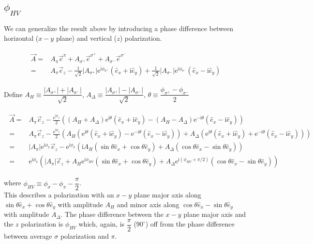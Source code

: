 \documentclass[10pt,fleqn]{article}
\newcommand{\ue}{\mathrm{e}}
\newcommand{\ui}{\mathrm{i}}
\newcommand{\eqar}[1]
{
  \begin{align}
    #1
  \end{align}
}
\newcommand{\paren}[1]{{\left({#1}\right)}}
\newcommand{\abs}[1]{{\left|{#1}\right|}}
\begin{document}
\subsection{$\phi_{HV}$}
We can generalize the result above by introducing a phase difference between
horizontal ($x-y$ plane) and vertical ($z$) polarization.
\eqar{
  \begin{split}
    \vec A=&A_\pi\vec e^\pi+A_{\sigma^+}\vec e^{\sigma^+}+A_{\sigma^-}\vec e^{\sigma^-}\\
    =&A_\pi\vec e_z-\frac{1}{\sqrt{2}}\abs{A_{\sigma^+}}\ue^{\ui\phi_{\sigma^+}}\paren{\hat e_x+\ui\hat e_y}+\frac{1}{\sqrt{2}}\abs{A_{\sigma^-}}\ue^{\ui\phi_{\sigma^-}}\paren{\hat e_x-\ui\hat e_y}
  \end{split}
}
Define $A_H\equiv\dfrac{\abs{A_{\sigma^+}}+\abs{A_{\sigma^-}}}{\sqrt2}$, $A_\Delta\equiv\dfrac{\abs{A_{\sigma^+}}-\abs{A_{\sigma^-}}}{\sqrt2}$, $\theta\equiv\dfrac{\phi_{\sigma^+}-\phi_{\sigma^-}}{2}$
\eqar{
  \begin{split}
    \vec A=&A_\pi\vec e_z-\frac{\ue^{\ui\phi_{\sigma}}}{2}\paren{\paren{A_H+A_\Delta}\ue^{\ui\theta}\paren{\hat e_x+\ui\hat e_y}-\paren{A_H-A_\Delta}\ue^{-\ui\theta}\paren{\hat e_x-\ui\hat e_y}}\\
    =&A_\pi\vec e_z-\frac{\ue^{\ui\phi_{\sigma}}}{2}\paren{
       A_H\paren{\ue^{\ui\theta}\paren{\hat e_x+\ui\hat e_y}
       -\ue^{-\ui\theta}\paren{\hat e_x-\ui\hat e_y}}
       +A_\Delta\paren{\ue^{\ui\theta}\paren{\hat e_x+\ui\hat e_y}
       +\ue^{-\ui\theta}\paren{\hat e_x-\ui\hat e_y}
       }
       }\\
    =&\abs{A_\pi}\ue^{\ui\phi_{\pi}}\vec e_z-\ue^{\ui\phi_{\sigma}}\paren{
       \ui A_H\paren{\sin\theta\hat e_x+\cos\theta\hat e_y}
       +A_\Delta\paren{\cos\theta\hat e_x-\sin\theta\hat e_y}
       }\\
    =&\ue^{\ui\phi_{\pi}}\paren{
       \abs{A_\pi}\vec e_z
       +A_H \ue^{\ui\phi_{HV}}\paren{\sin\theta\hat e_x+\cos\theta\hat e_y}
       +A_\Delta\ue^{\ui\paren{\phi_{HV}+\pi/2}}
       \paren{\cos\theta\hat e_x-\sin\theta\hat e_y}
       }
  \end{split}
}
where $\phi_{HV}\equiv\phi_{\sigma}-\phi_\pi-\dfrac{\pi}{2}$.\\

This describes a polarization with an $x-y$ plane major axis along $\sin\theta\hat e_x+\cos\theta\hat e_y$ with amplitude $A_H$ and minor axis along $\cos\theta\hat e_x-\sin\theta\hat e_y$ with amplitude $A_\Delta$. The phase difference between the $x-y$ plane major axis and the $z$ polarization is $\phi_{HV}$ which, again, is $\dfrac\pi2$ ($90^\circ$) off from the phase difference between average $\sigma$ polarization and $\pi$.
\end{document}
